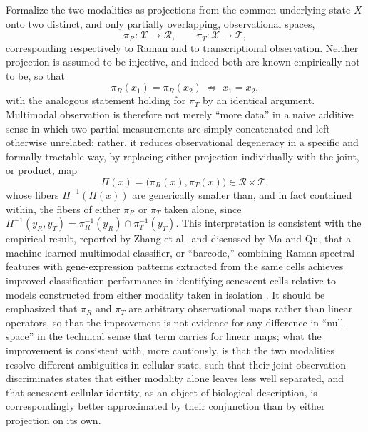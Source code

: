 \documentclass[11pt]{article}
\begin{document}
Formalize the two modalities as projections from the common underlying state $X$ onto two distinct, and only partially overlapping, observational spaces,
\begin{equation}
\pi_R : \mathcal{X} \to \mathcal{R}, \qquad \pi_T : \mathcal{X} \to \mathcal{T},
\end{equation}
corresponding respectively to Raman and to transcriptional observation. Neither projection is assumed to be injective, and indeed both are known empirically not to be, so that
\begin{equation}
\pi_R(x_1) = \pi_R(x_2) \; \not\Longrightarrow \; x_1 = x_2,
\end{equation}
with the analogous statement holding for $\pi_T$ by an identical argument. Multimodal observation is therefore not merely ``more data'' in a naive additive sense in which two partial measurements are simply concatenated and left otherwise unrelated; rather, it reduces observational degeneracy in a specific and formally tractable way, by replacing either projection individually with the joint, or product, map
\begin{equation}
\Pi(x) = \bigl(\pi_R(x), \pi_T(x)\bigr) \in \mathcal{R} \times \mathcal{T},
\end{equation}
whose fibers $\Pi^{-1}(\Pi(x))$ are generically smaller than, and in fact contained within, the fibers of either $\pi_R$ or $\pi_T$ taken alone, since $\Pi^{-1}(y_R, y_T) = \pi_R^{-1}(y_R) \cap \pi_T^{-1}(y_T)$. This interpretation is consistent with the empirical result, reported by Zhang et al.\ and discussed by Ma and Qu, that a machine-learned multimodal classifier, or ``barcode,'' combining Raman spectral features with gene-expression patterns extracted from the same cells achieves improved classification performance in identifying senescent cells relative to models constructed from either modality taken in isolation \cite{zhang2026,maqu2026}. It should be emphasized that $\pi_R$ and $\pi_T$ are arbitrary observational maps rather than linear operators, so that the improvement is not evidence for any difference in ``null space'' in the technical sense that term carries for linear maps; what the improvement is consistent with, more cautiously, is that the two modalities resolve different ambiguities in cellular state, such that their joint observation discriminates states that either modality alone leaves less well separated, and that senescent cellular identity, as an object of biological description, is correspondingly better approximated by their conjunction than by either projection on its own.
\end{document}
